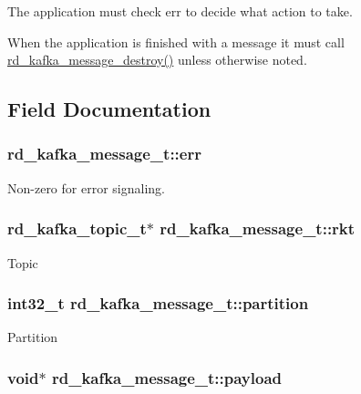 The application must check {\ttfamily err} to decide what action to take.

When the application is finished with a message it must call \hyperlink{rdkafka_8h_a35e0c519209d1afe9e29468f766c1c24}{rd\_\-kafka\_\-message\_\-destroy()} unless otherwise noted. 

\subsection{Field Documentation}
\hypertarget{structrd__kafka__message__t_aed08051a31f216cc0369c734493bbc46}{
\subsubsection[{err}]{ {\bf rd\_\-kafka\_\-message\_\-t::err}}}
\label{structrd__kafka__message__t_aed08051a31f216cc0369c734493bbc46}
Non-\/zero for error signaling. \hypertarget{structrd__kafka__message__t_ad99c2966a73d2a0be7acf101c41d70f1}{
\subsubsection[{rkt}]{\setlength{\rightskip}{0pt plus 5cm}rd\_\-kafka\_\-topic\_\-t$\ast$ {\bf rd\_\-kafka\_\-message\_\-t::rkt}}}
\label{structrd__kafka__message__t_ad99c2966a73d2a0be7acf101c41d70f1}
Topic \hypertarget{structrd__kafka__message__t_aad65babd39a553e48269e7469e36a09a}{
\subsubsection[{partition}]{\setlength{\rightskip}{0pt plus 5cm}int32\_\-t {\bf rd\_\-kafka\_\-message\_\-t::partition}}}
\label{structrd__kafka__message__t_aad65babd39a553e48269e7469e36a09a}
Partition \hypertarget{structrd__kafka__message__t_aa78acb7414a91d7009268e84b1526b7f}{
\subsubsection[{payload}]{\setlength{\rightskip}{0pt plus 5cm}void$\ast$ {\bf rd\_\-kafka\_\-message\_\-t::payload}}}
